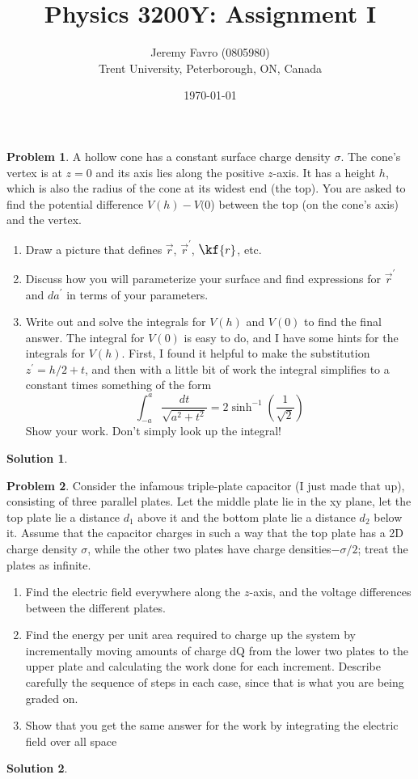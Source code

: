 \documentclass[10pt]{article}
\title{Physics 3200Y: Assignment I}
\author{Jeremy Favro (0805980) \\ Trent University, Peterborough, ON, Canada}
\date{\today}
\theoremstyle{definition}
\newtheorem{problem}{Problem}
\newtheorem{soln}{Solution}
\newcommand{\primed}[1]{#1^\prime}
\newcommand{\scriptr}{\fontsize{12pt}{12pt}\kf{r}}
\begin{document}
\maketitle

\begin{problem}
A hollow cone has a constant surface charge density $\sigma$. The cone's vertex is at $z = 0$ and its axis lies along the
positive $z$-axis. It has a height $h$, which is also the radius of the cone at its widest end (the top). You are asked
to find the potential difference $V (h) - V (0$) between the top (on the cone's axis) and the vertex.
\begin{enumerate}[label=(\alph*)]
  \item Draw a picture that defines $\vec{r}$, $\primed{\vec{r}}$, $\scriptr$, etc.
  \item Discuss how you will parameterize your surface and find expressions for $\primed{\vec{r}}$ and $d\primed{a}$ in terms of your parameters.
  \item Write out and solve the integrals for $V (h)$ and $V (0)$ to find the final answer. The integral for $V (0)$ is easy
        to do, and I have some hints for the integrals for $V (h)$. First, I found it helpful to make the substitution
        $\primed{z}=h/2+t$, and then with a little bit of work the integral simplifies to a constant times something of the
        form
        $$\int_{-a}^{a}\frac{dt}{\sqrt{a^2+t^2}}=2\sinh^{-1}(\frac{1}{\sqrt{2}})$$
        Show your work. Don't simply look up the integral!
\end{enumerate}
\end{problem}
\begin{soln}
\end{soln}

\begin{problem}
Consider the infamous triple-plate capacitor (I just made that up), consisting of three parallel plates. Let the
middle plate lie in the xy plane, let the top plate lie a distance $d_1$ above it and the bottom plate lie a distance
$d_2$ below it. Assume that the capacitor charges in such a way that the top plate has a 2D charge density $\sigma$,
while the other two plates have charge densities$-\sigma/2$; treat the plates as infinite.
\begin{enumerate}[label=(\alph*)]
  \item Find the electric field everywhere along the $z$-axis, and the voltage differences between the different plates.
  \item Find the energy per unit area required to charge up the system by incrementally moving amounts of
        charge dQ from the lower two plates to the upper plate and calculating the work done for each increment.
        Describe carefully the sequence of steps in each case, since that is what you are being graded on.
  \item Show that you get the same answer for the work by integrating the electric field over all space
\end{enumerate}
\end{problem}
\begin{soln}
\end{soln}
\end{document}
